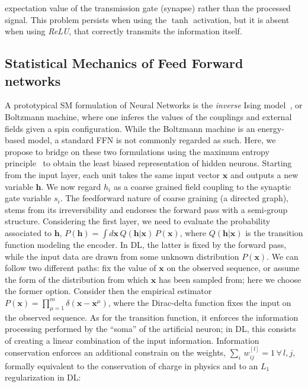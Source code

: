 \documentclass{article}
\begin{document}
expectation value of the transmission gate (synapse) rather than the processed signal. This problem persists when using the $\tanh$ activation, but it is absent when using {\it ReLU}, that correctly transmits the information itself.

\subsection{Statistical Mechanics of Feed Forward networks}

A prototypical SM formulation of Neural Networks is the {\it inverse} Ising model~\cite{zecchina}, or Boltzmann machine, where one inferes the values of the couplings and external fields given a spin configuration.  While the Boltzmann machine is an energy-based model, a standard FFN is not commonly regarded as such. Here, we propose to bridge on these two formulations using the maximum entropy principle~\cite{zecchina, roberto, mckay, jaynes} to obtain the least biased representation of hidden neurons. Starting from the input layer, each unit takes the same input vector $\mathbf{x}$ and outputs a new variable $\mathbf{h}$. We now regard $h_i$ as a coarse grained field coupling to the synaptic gate variable $s_i$. The feedforward nature of coarse graining (a directed graph), stems from its irreversibility and endorses the forward pass with a semi-group structure. Considering the first layer, we need to evaluate the probability associated to  $\mathbf{h}$, $P(\mathbf{h}) =  \int d \mathbf{x} \, Q(\mathbf{h} | \mathbf{x} ) \, P(\mathbf{x})$, where  $Q(\mathbf{h} | \mathbf{x} )$ is the transition function modeling the encoder. In DL, the latter is fixed by the forward pass, while the input data are drawn from some unknown distribution $P(\mathbf{x})$. We can follow two different paths: fix the value of $\mathbf{x}$ on the observed sequence, or assume the form of the distribution from which $\mathbf{x}$ has been sampled from; here we choose the former option. Consider then the empirical estimator $P(\mathbf{x}) =  \prod_{\mu=1}^m  \delta( \mathbf{x} - \mathbf{x}^{\mu} )$, where the Dirac-delta function  fixes the input on the observed sequence. As for the transition function, it enforces the information processing performed by the ``soma'' of the artificial neuron; in DL, this consists of creating a linear combination of the input information. Information conservation enforces an additional constrain on the weights, $\sum_i \, w_{ij}^{[l]} =1 \, \forall \, l,j$, formally equivalent to the conservation of charge in physics and to an $L_1$ regularization in DL:
\end{document}
